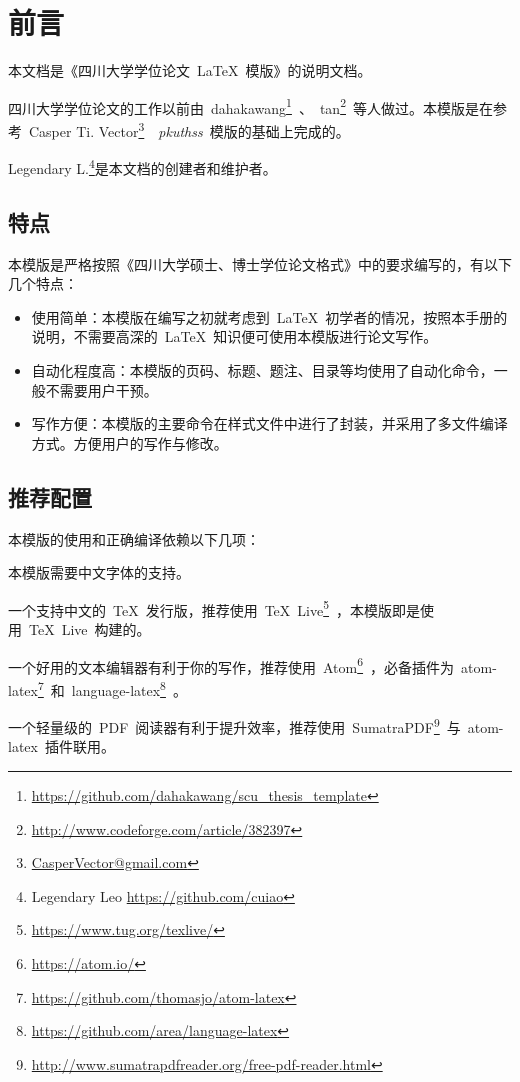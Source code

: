 \chapter{前言}
\label{Chap_Intro}
本文档是《四川大学学位论文~\LaTeX~模版》的说明文档。


四川大学学位论文的工作以前由~dahakawang\footnote{\url{https://github.com/dahakawang/scu_thesis_template}}~、~tan\footnote{\url{http://www.codeforge.com/article/382397}}~等人做过。本模版是在参考~Casper Ti. Vector\footnote{\url{CasperVector@gmail.com}}~~\emph{pkuthss}~模版\cite{pkuthss}的基础上完成的。


Legendary L.\footnote{Legendary Leo \url{https://github.com/cuiao}}是本文档的创建者和维护者。

\section{特点}
\label{Sect_KeyFeatures}
本模版是严格按照《四川大学硕士、博士学位论文格式》\cite{SCUDissertationFormat}中的要求编写的，有以下几个特点：
\begin{itemize}
	\item 使用简单：本模版在编写之初就考虑到~\LaTeX~初学者的情况，按照本手册的说明，不需要高深的~\LaTeX~知识便可使用本模版进行论文写作。
	\item 自动化程度高：本模版的页码、标题、题注、目录等均使用了自动化命令，一般不需要用户干预。
	\item 写作方便：本模版的主要命令在样式文件中进行了封装，并采用了多文件编译方式。方便用户的写作与修改。
\end{itemize}

\section{推荐配置}
\label{Sect_RecommandedConfiguration}
本模版的使用和正确编译依赖以下几项：
\begin{description}[style=nextline,labelindent=2em,labelwidth=!]
	\item[中文字体] 本模版需要中文字体的支持。
	\item[\TeX~发行版] 一个支持中文的~\TeX~发行版，推荐使用~\TeX~Live\footnote{\url{https://www.tug.org/texlive/}}~，本模版即是使用~\TeX~Live~构建的。
	\item[文本编辑器] 一个好用的文本编辑器有利于你的写作，推荐使用~Atom\footnote{\url{https://atom.io/}}~，必备插件为~atom-latex\footnote{\url{https://github.com/thomasjo/atom-latex}}~和~language-latex\footnote{\url{https://github.com/area/language-latex}}~。
	\item[PDF~阅读器] 一个轻量级的~PDF~阅读器有利于提升效率，推荐使用~SumatraPDF\footnote{\url{http://www.sumatrapdfreader.org/free-pdf-reader.html}}~与~atom-latex~插件联用。
\end{description}


